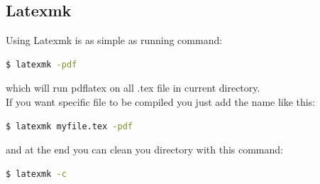 \documentclass[a4paper,oneside,8pt]{extarticle}
\begin{document}
\subsection{Latexmk}
Using Latexmk is as simple as running command:\\

\begin{lstlisting}[language=bash]
    $ latexmk -pdf
\end{lstlisting}

which will run pdflatex on all .tex file in current directory.\\
If you want specific file to be compiled you just add the name like this:\\

\begin{lstlisting}[language=bash]
    $ latexmk myfile.tex -pdf
\end{lstlisting}

and at the end you can clean you directory with this command:\\

\begin{lstlisting}[language=bash]
    $ latexmk -c
\end{lstlisting}

\nocite{*}

\pagebreak

\printbibliography[heading=bibintoc]
\end{document}
